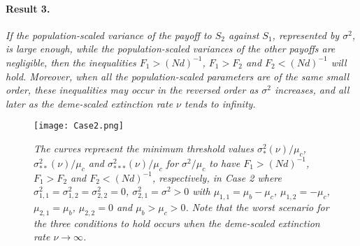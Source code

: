 \documentclass[11pt]{article}
\begin{document}
\paragraph{Result 3.}
\textit{
If the population-scaled variance of the payoff to $S_2$ against $S_1$, represented by $\sigma^2_{}$, is large enough, while the population-scaled variances  of the other payoffs are negligible, then the inequalities $F_1>(Nd)^{-1}$, $F_1 > F_2$ and $F_2<(Nd)^{-1}$ will hold. Moreover, when all the population-scaled parameters are of the same small order, these inequalities may occur in the reversed order as $\sigma^2$ increases, and all later  as the deme-scaled extinction rate $\nu$ tends to infinity.
}



\begin{figure}[hbt!]
\texttt{[image: Case2.png]}
\caption{\textit{The curves represent the minimum threshold values $\sigma^2_{*}(\nu)/\mu_c$, $\sigma^2_{**}(\nu)/\mu_c$ and $\sigma^2_{***}(\nu)/\mu_c$ for $\sigma_{}^2/\mu_c$ to have $F_1>(Nd)^{-1}$, $F_1 > F_2$ and  $F_2<(Nd)^{-1}$, respectively, in Case 2 where $\sigma^2_{1,1}=\sigma^2_{1,2}=\sigma^2_{2,2}=0$, $\sigma^2_{2,1}=\sigma^2>0$ with $\mu_{1,1}=\mu_b-\mu_c$, $\mu_{1,2}=-\mu_c$, $\mu_{2,1}=\mu_b$, $\mu_{2,2}=0$ and $\mu_b>\mu_c>0$.  Note that the worst scenario for the three conditions to hold occurs when the deme-scaled extinction rate $\nu\rightarrow\infty$.
}}
\label{figure2}
\end{figure}
\end{document}
